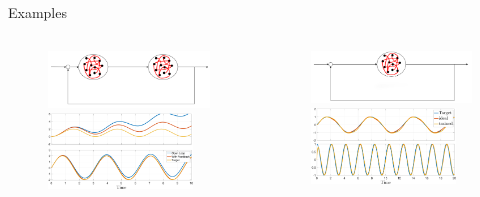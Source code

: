 \documentclass[17pt, t, lualatex]{beamer}
\begin{document}
\begin{frame}{Examples}
	\vspace{-1.5cm}
	\begin{columns}
		\begin{column}{0.45\textwidth}
			\begin{figure}
				\centering
				\includegraphics[scale = 0.15]{figures/control_3.png}
				\includegraphics[width = 0.9\textwidth]{figures/plots/everything/feedback_2_nets.pdf}
			\end{figure}
		\end{column}
		\begin{column}{0.45\textwidth}
			\begin{figure}
				\centering
				\includegraphics[scale = 0.12]{figures/control_4.png}
				\includegraphics[width = 0.9\textwidth]{figures/plots/everything/all_closed_sine_base.pdf}
			\end{figure}
		\end{column}
	\end{columns}
\end{frame}
\end{document}

